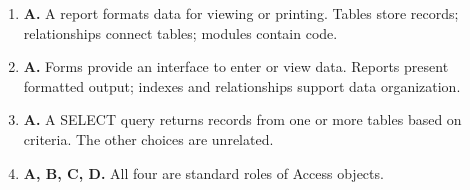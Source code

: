 \begin{enumerate}[label=\textbf{Q\arabic*.}, leftmargin=*]
\item \textbf{A.} A report formats data for viewing or printing. Tables store records; relationships connect tables; modules contain code.

\item \textbf{A.} Forms provide an interface to enter or view data. Reports present formatted output; indexes and relationships support data organization.

\item \textbf{A.} A SELECT query returns records from one or more tables based on criteria. The other choices are unrelated.

\item \textbf{A, B, C, D.} All four are standard roles of Access objects.

\end{enumerate}
